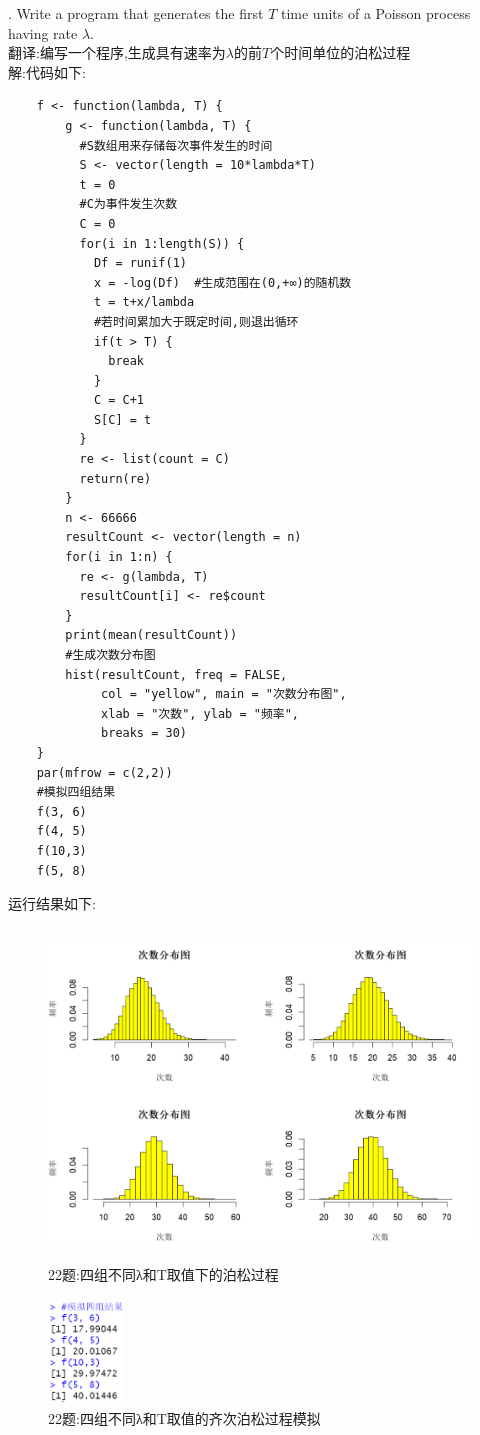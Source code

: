 \documentclass{book}
\begin{document}
. Write a program that generates the first $T$ time units of a Poisson process having rate $\lambda$. \\
翻译:编写一个程序,生成具有速率为$\lambda$的前$T$个时间单位的泊松过程 \\
解:代码如下:
\lstset{language = R}
\begin{lstlisting}
    f <- function(lambda, T) {
        g <- function(lambda, T) {
          #S数组用来存储每次事件发生的时间
          S <- vector(length = 10*lambda*T)
          t = 0
          #C为事件发生次数
          C = 0
          for(i in 1:length(S)) {
            Df = runif(1)
            x = -log(Df)  #生成范围在(0,+∞)的随机数
            t = t+x/lambda
            #若时间累加大于既定时间,则退出循环
            if(t > T) {
              break
            } 
            C = C+1
            S[C] = t
          }
          re <- list(count = C)
          return(re)
        }
        n <- 66666
        resultCount <- vector(length = n)
        for(i in 1:n) {
          re <- g(lambda, T)
          resultCount[i] <- re$count 
        }
        print(mean(resultCount))
        #生成次数分布图
        hist(resultCount, freq = FALSE,  
             col = "yellow", main = "次数分布图",
             xlab = "次数", ylab = "频率",
             breaks = 30)
    }
    par(mfrow = c(2,2))
    #模拟四组结果
    f(3, 6)
    f(4, 5)
    f(10,3)
    f(5, 8)
\end{lstlisting}
运行结果如下:
\begin{figure}[H]
  \centering
  \includegraphics*[height = 8.8cm, width = 11.5cm]{gramFile/第二十二题/不同λ和T取值下的泊松过程.PNG}
  \caption{22题:四组不同λ和T取值下的泊松过程}
\end{figure}
\begin{figure}[H]
  \centering
  \includegraphics*[height = 2.8cm, width = 2cm]{gramFile/第二十二题/四组不同λ和T取值的齐次泊松过程模拟.PNG}
  \caption{22题:四组不同λ和T取值的齐次泊松过程模拟}
\end{figure}
\end{document}
